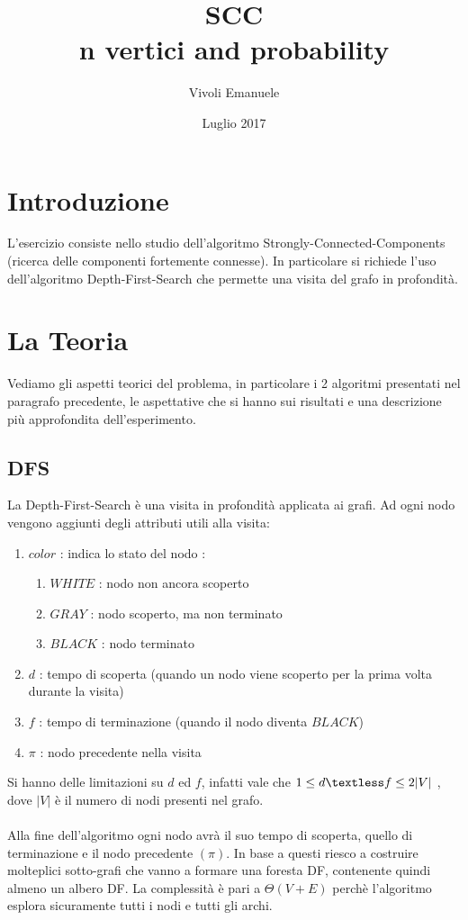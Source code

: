\documentclass{article}
\title{\huge{SCC}\\{n vertici and probability}}
\author{Vivoli Emanuele}
\date{Luglio 2017}
\makeatletter
\renewcommand\tableofcontents{%
    \@starttoc{toc}%
}
\makeatother
\begin{document}
\maketitle
\vspace*{0.20\textheight}
\tableofcontents

\newpage
\section{Introduzione}
L'esercizio consiste nello studio dell'algoritmo Strongly-Connected-Components (ricerca delle componenti fortemente connesse). In particolare si richiede l'uso dell'algoritmo Depth-First-Search che permette una visita del grafo in profondità.

\section{La Teoria}
Vediamo gli aspetti teorici del problema, in particolare i 2 algoritmi presentati nel paragrafo precedente, le aspettative che si hanno sui risultati e una descrizione più approfondita dell'esperimento.

\subsection{DFS}
La Depth-First-Search è una visita in profondità applicata ai grafi. Ad ogni nodo vengono aggiunti degli attributi utili alla visita:
\begin{enumerate}
\item $color$ : indica lo stato del nodo :
\begin{enumerate}
\item $WHITE$ : nodo non ancora scoperto
\item $GRAY$ : nodo scoperto, ma non terminato
\item $BLACK$ : nodo terminato
\end{enumerate}
\item $d$ : tempo di scoperta (quando un nodo viene scoperto per la prima volta durante la visita)
\item $f$ : tempo di terminazione (quando il nodo diventa $BLACK$)
\item $\pi$ : nodo precedente nella visita
\end{enumerate}
Si hanno delle limitazioni su $d$ ed $f$, infatti vale che $1 \leq d \textless f \leq 2|V|$ , dove $|V|$ è il numero di nodi presenti nel grafo.\\ \\
Alla fine dell'algoritmo ogni nodo avrà il suo tempo di scoperta, quello di terminazione e il nodo precedente $(\pi)$. In base a questi riesco a costruire molteplici sotto-grafi che vanno a formare una foresta DF, contenente quindi almeno un albero DF. La complessità è pari a $\Theta(V + E)$ perchè l'algoritmo esplora sicuramente tutti i nodi e tutti gli archi. 
\end{document}

